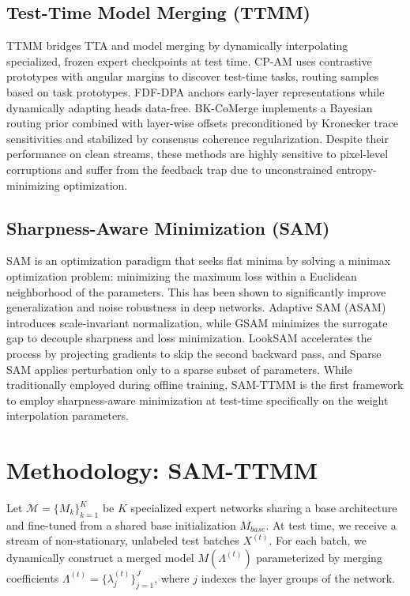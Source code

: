 \documentclass{article}
\theoremstyle{plain}
\theoremstyle{definition}
\theoremstyle{remark}
\begin{document}
\subsection{Test-Time Model Merging (TTMM)}
TTMM bridges TTA and model merging by dynamically interpolating specialized, frozen expert checkpoints at test time. CP-AM \cite{cpam2026} uses contrastive prototypes with angular margins to discover test-time tasks, routing samples based on task prototypes. FDF-DPA \cite{fdfdpa2026} anchors early-layer representations while dynamically adapting heads data-free. BK-CoMerge \cite{bkcomerge2026} implements a Bayesian routing prior combined with layer-wise offsets preconditioned by Kronecker trace sensitivities and stabilized by consensus coherence regularization. Despite their performance on clean streams, these methods are highly sensitive to pixel-level corruptions and suffer from the feedback trap due to unconstrained entropy-minimizing optimization.

\subsection{Sharpness-Aware Minimization (SAM)}
SAM \cite{foret2020sharpness} is an optimization paradigm that seeks flat minima by solving a minimax optimization problem: minimizing the maximum loss within a Euclidean neighborhood of the parameters. This has been shown to significantly improve generalization and noise robustness in deep networks. Adaptive SAM (ASAM) \cite{wu2020asam} introduces scale-invariant normalization, while GSAM \cite{zhuang2022gsam} minimizes the surrogate gap to decouple sharpness and loss minimization. LookSAM \cite{liu2022looksam} accelerates the process by projecting gradients to skip the second backward pass, and Sparse SAM \cite{zhao2022sparse} applies perturbation only to a sparse subset of parameters. While traditionally employed during offline training, SAM-TTMM is the first framework to employ sharpness-aware minimization at test-time specifically on the weight interpolation parameters.

\section{Methodology: SAM-TTMM}
\label{sec:method}

Let $\mathcal{M} = \{M_k\}_{k=1}^K$ be $K$ specialized expert networks sharing a base architecture and fine-tuned from a shared base initialization $M_{base}$. At test time, we receive a stream of non-stationary, unlabeled test batches $X^{(t)}$. For each batch, we dynamically construct a merged model $M(\Lambda^{(t)})$ parameterized by merging coefficients $\Lambda^{(t)} = \{\lambda_j^{(t)}\}_{j=1}^J$, where $j$ indexes the layer groups of the network.
\end{document}
